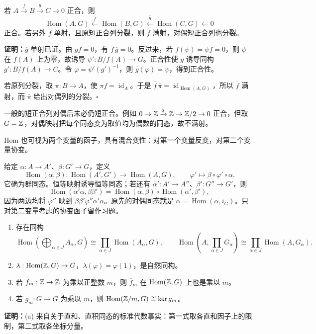 若 $A\xrightarrow{f}B\xrightarrow{g}C\to0$ 正合，则
\[
\operatorname{Hom}(A,G)\xleftarrow{\overline f}\operatorname{Hom}(B,G)
\xleftarrow{\overline g}\operatorname{Hom}(C,G)\leftarrow0
\]
正合。若另外 $f$ 单射，且原短正合列分裂，则 $\overline f$ 满射，对偶短正合列也分裂。

\textbf{证明：}$\overline g$ 单射已证。由 $gf=0$，有 $\overline f\,\overline g=0$。反过来，若 $\overline f(\psi)=\psi f=0$，则 $\psi$ 在 $f(A)$ 上为零，故诱导 $\psi':B/f(A)\to G$。正合性使 $g$ 诱导同构 $g':B/f(A)\to C$。令 $\varphi=\psi'(g')^{-1}$，则 $\overline g(\varphi)=\psi$，得到正合性。

若原列分裂，取 $\pi:B\to A$，使 $\pi f=\operatorname{id}_A$。于是 $\overline f\,\overline\pi=\operatorname{id}_{\operatorname{Hom}(A,G)}$，所以 $\overline f$ 满射，而 $\overline\pi$ 给出对偶列的分裂。\hfill$\square$

一般的短正合列对偶后未必仍短正合。例如 $0\to\mathbb{Z}\xrightarrow{2}\mathbb{Z}\to\mathbb{Z}/2\to0$ 正合，但取 $G=\mathbb{Z}$，对偶映射把每个同态变为取值均为偶数的同态，故不满射。

Hom 也可视为两个变量的函子，具有混合变性：对第一个变量反变，对第二个变量协变。

给定 $\alpha:A\to A'$、$\beta:G'\to G$，定义
\[
\operatorname{Hom}(\alpha,\beta):\operatorname{Hom}(A',G')\to\operatorname{Hom}(A,G),\qquad
\varphi'\mapsto\beta\circ\varphi'\circ\alpha.
\]
它确为群同态。恒等映射诱导恒等同态；若还有 $\alpha':A'\to A''$、$\beta':G''\to G'$，则
\[
\operatorname{Hom}(\alpha'\alpha,\beta\beta')=
\operatorname{Hom}(\alpha,\beta)\circ\operatorname{Hom}(\alpha',\beta'),
\]
因为两边均将 $\varphi''$ 映到 $\beta\beta'\varphi''\alpha'\alpha$。原先的对偶同态就是 $\overline\alpha=\operatorname{Hom}(\alpha,i_G)$。只对第二变量考虑的协变函子留作习题。

\begin{enumerate}[label=(\alph*)]
\item 存在同构
\[
\operatorname{Hom}(\bigoplus_{\alpha\in J}A_\alpha,G)\cong\prod_{\alpha\in J}\operatorname{Hom}(A_\alpha,G),\qquad
\operatorname{Hom}(A,\prod_{\alpha\in J}G_\alpha)\cong\prod_{\alpha\in J}\operatorname{Hom}(A,G_\alpha).
\]
\item $\lambda:\operatorname{Hom}(\mathbb{Z},G)\to G$，$\lambda(\varphi)=\varphi(1)$，是自然同构。
\item 若 $f_m:\mathbb{Z}\to\mathbb{Z}$ 为乘以正整数 $m$，则 $\overline f_m$ 在 $\operatorname{Hom}(\mathbb{Z},G)$ 上也是乘以 $m$。
\item 若 $g_m:G\to G$ 为乘以 $m$，则 $\operatorname{Hom}(\mathbb{Z}/m,G)\cong\ker g_m$。
\end{enumerate}
\textbf{证明：}(a) 来自关于直和、直积同态的标准代数事实：第一式取各直和因子上的限制，第二式取各坐标分量。

